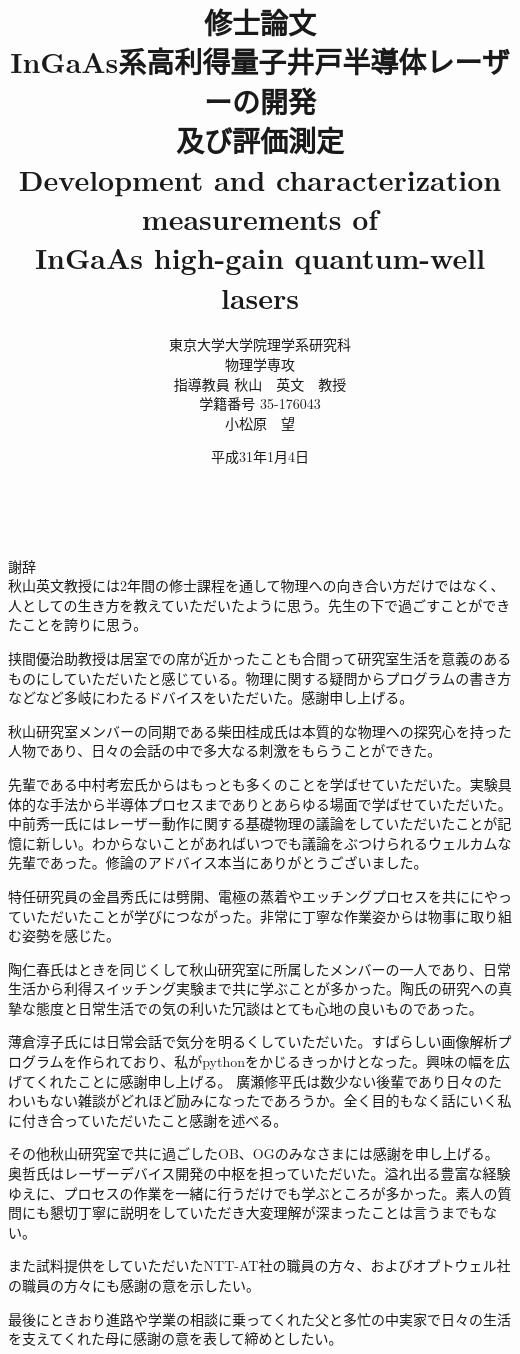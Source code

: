 \documentclass[11pt,dvipdfmx]{jreport}
\title{
{\LARGE 修士論文\\[1cm]}
{\huge InGaAs系高利得量子井戸半導体レーザーの開発\\及び評価測定\\[1cm]
Development and characterization measurements of \\InGaAs high-gain quantum-well
lasers\\[5cm]}
}
\date{\LARGE 平成31年1月4日}
\author{\LARGE 東京大学大学院理学系研究科\\
\LARGE 物理学専攻\\[1cm]
\LARGE 指導教員 秋山　英文　教授\\[1cm]
\LARGE 学籍番号 35-176043\\
\LARGE 小松原　望}
\begin{document}
\maketitle			%
\tableofcontents 	%
\listoffigures 		%
\listoftables　		%


謝辞\\
秋山英文教授には2年間の修士課程を通して物理への向き合い方だけではなく、人としての生き方を教えていただいたように思う。先生の下で過ごすことができたことを誇りに思う。


挟間優治助教授は居室での席が近かったことも合間って研究室生活を意義のあるものにしていただいたと感じている。物理に関する疑問からプログラムの書き方などなど多岐にわたるドバイスをいただいた。感謝申し上げる。


秋山研究室メンバーの同期である柴田桂成氏は本質的な物理への探究心を持った人物であり、日々の会話の中で多大なる刺激をもらうことができた。


先輩である中村考宏氏からはもっとも多くのことを学ばせていただいた。実験具体的な手法から半導体プロセスまでありとあらゆる場面で学ばせていただいた。中前秀一氏にはレーザー動作に関する基礎物理の議論をしていただいたことが記憶に新しい。わからないことがあればいつでも議論をぶつけられるウェルカムな先輩であった。修論のアドバイス本当にありがとうございました。


特任研究員の金昌秀氏には劈開、電極の蒸着やエッチングプロセスを共ににやっていただいたことが学びにつながった。非常に丁寧な作業姿からは物事に取り組む姿勢を感じた。

陶仁春氏はときを同じくして秋山研究室に所属したメンバーの一人であり、日常生活から利得スイッチング実験まで共に学ぶことが多かった。陶氏の研究への真摯な態度と日常生活での気の利いた冗談はとても心地の良いものであった。


薄倉淳子氏には日常会話で気分を明るくしていただいた。すばらしい画像解析プログラムを作られており、私がpythonをかじるきっかけとなった。興味の幅を広げてくれたことに感謝申し上げる。
廣瀬修平氏は数少ない後輩であり日々のたわいもない雑談がどれほど励みになったであろうか。全く目的もなく話にいく私に付き合っていただいたこと感謝を述べる。

その他秋山研究室で共に過ごしたOB、OGのみなさまには感謝を申し上げる。
奥哲氏はレーザーデバイス開発の中枢を担っていただいた。溢れ出る豊富な経験ゆえに、プロセスの作業を一緒に行うだけでも学ぶところが多かった。素人の質問にも懇切丁寧に説明をしていただき大変理解が深まったことは言うまでもない。


また試料提供をしていただいたNTT-AT社の職員の方々、およびオプトウェル社の職員の方々にも感謝の意を示したい。


最後にときおり進路や学業の相談に乗ってくれた父と多忙の中実家で日々の生活を支えてくれた母に感謝の意を表して締めとしたい。

\end{document}
